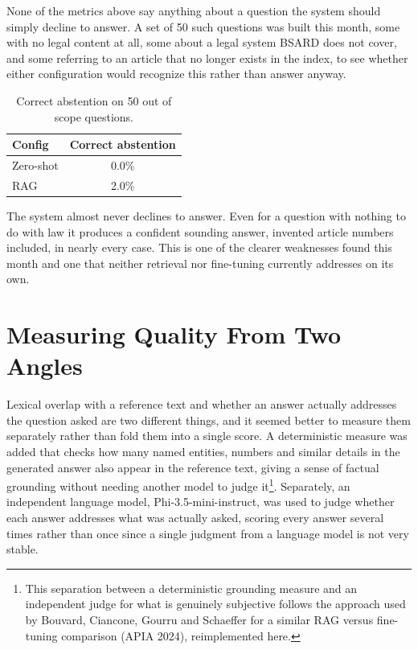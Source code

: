 \documentclass[11pt, a4paper]{article}
\begin{document}
None of the metrics above say anything about a question the system should simply decline to answer. A set of 50 such questions was built this month, some with no legal content at all, some about a legal system BSARD does not cover, and some referring to an article that no longer exists in the index, to see whether either configuration would recognize this rather than answer anyway.

\begin{table}[H]
\centering
\small
\begin{tabular}{lc}
\toprule
\textbf{Config} & \textbf{Correct abstention} \\
\midrule
Zero-shot & 0.0\% \\
RAG & 2.0\% \\
\bottomrule
\end{tabular}
\caption{Correct abstention on 50 out of scope questions.}
\label{tab:abstention}
\end{table}

The system almost never declines to answer. Even for a question with nothing to do with law it produces a confident sounding answer, invented article numbers included, in nearly every case. This is one of the clearer weaknesses found this month and one that neither retrieval nor fine-tuning currently addresses on its own.

\section{Measuring Quality From Two Angles}

Lexical overlap with a reference text and whether an answer actually addresses the question asked are two different things, and it seemed better to measure them separately rather than fold them into a single score. A deterministic measure was added that checks how many named entities, numbers and similar details in the generated answer also appear in the reference text, giving a sense of factual grounding without needing another model to judge it\footnote{This separation between a deterministic grounding measure and an independent judge for what is genuinely subjective follows the approach used by Bouvard, Ciancone, Gourru and Schaeffer for a similar RAG versus fine-tuning comparison (APIA 2024), reimplemented here.}. Separately, an independent language model, Phi-3.5-mini-instruct, was used to judge whether each answer addresses what was actually asked, scoring every answer several times rather than once since a single judgment from a language model is not very stable.
\end{document}

